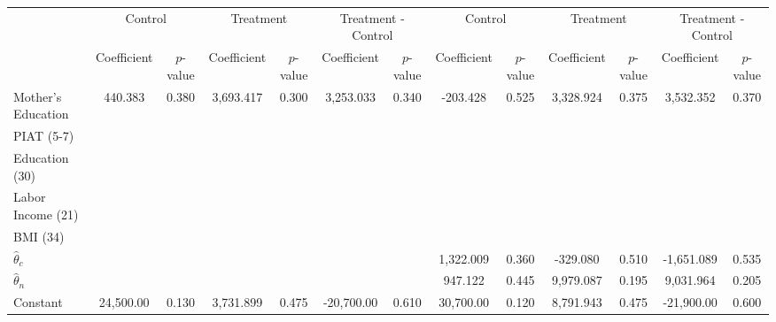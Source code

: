 \begin{tabular}{lcccccccccccc} \toprule
&\multicolumn{2}{c}{Control} & \multicolumn{2}{c}{Treatment} & \multicolumn{2}{c}{Treatment - Control} & \multicolumn{2}{c}{Control} & \multicolumn{2}{c}{Treatment} & \multicolumn{2}{c}{Treatment - Control} \\
 & Coefficient  & $p$-value  & Coefficient  & $p$-value & Coefficient  & $p$-value  & Coefficient  & $p$-value  & Coefficient  & $p$-value  & Coefficient  & $p$-value \\ \midrule
Mother's Education &   440.383 &     0.380 &  3,693.417 &     0.300 &  3,253.033 &     0.340 &  -203.428 &     0.525 &  3,328.924 &     0.375 &  3,532.352 &     0.370 \\  
PIAT (5-7) &         &         &         &         &         &         &         &         &         &         &         &         \\
Education (30) &         &         &         &         &         &         &         &         &         &         &         &         \\
Labor Income (21) &         &         &         &         &         &         &         &         &         &         &         &         \\
BMI (34) &         &         &         &         &         &         &         &         &         &         &         &         \\
$\hat{\theta}_{c}$ &         &         &         &         &         &         &  1,322.009 &     0.360 &  -329.080 &     0.510 & -1,651.089 &     0.535 \\  
$\hat{\theta}_{n}$ &         &         &         &         &         &         &   947.122 &     0.445 &  9,979.087 &     0.195 &  9,031.964 &     0.205 \\  
Constant  & 24,500.00 &     0.130 &  3,731.899 &     0.475 & -20,700.00 &     0.610 & 30,700.00 &     0.120 &  8,791.943 &     0.475 & -21,900.00 &     0.600 \\  
\bottomrule \end{tabular}
